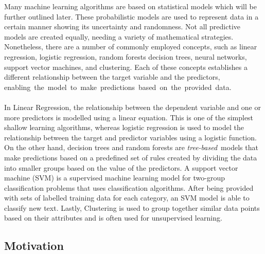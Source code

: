 \documentclass{article}[12pt]
\theoremstyle{definition}
\begin{document}
Many machine learning algorithms are based on statistical models which will be further outlined later. These probabilistic models are used to represent data in a certain manner showing its uncertainty and randomness. Not all predictive models are created equally, needing a variety of mathematical strategies. Nonetheless, there are a number of commonly employed concepts, such as linear regression, logistic regression, random forests decision trees, neural networks, support vector machines, and clustering. Each of these concepts establishes a different relationship between the target variable and the predictors, \mbox{enabling the model to make predictions based on the provided data.}
\\
\\
In Linear Regression, the relationship between the dependent variable and one or more predictors is modelled using a linear equation. This is one of the simplest shallow learning algorithms, whereas logistic regression is used to model the relationship between the target and predictor variables using a logistic function. On the other hand, decision trees and random forests are \emph{tree-based} models that make predictions based on a predefined set of rules created by dividing the data into smaller groups based on the value of the predictors. A support vector machine (SVM) is a supervised machine learning model for two-group classification problems that uses classification algorithms. After being provided with sets of labelled training data for each category, an SVM model is able to classify new text. Lastly, Clustering is used to group together similar data points based on their attributes and is often used for unsupervised learning. 

\bigskip

\subsection{Motivation}

\bigskip
\end{document}
